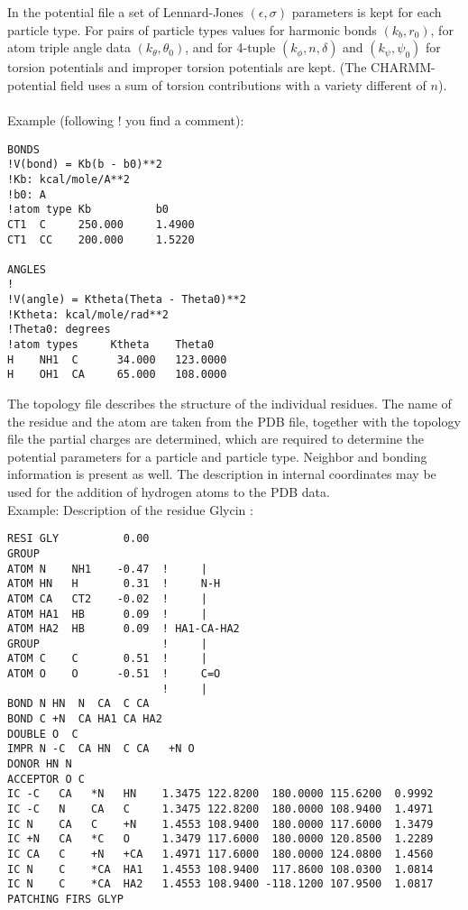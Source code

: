 In the potential file a set of Lennard-Jones $(\epsilon, \sigma)$ parameters is
kept for each particle type. For pairs of particle types values for harmonic bonds
$( k_b, r_0)$, for atom triple angle data $(k_\theta,
\theta_0)$, and for 4-tuple $(k_\phi, n, \delta)$ and $(k_\psi, \psi_0)$
for torsion potentials and improper torsion potentials are kept. (The CHARMM-potential field uses
a sum of torsion contributions with a variety different of $n$).\\
\\
Example \cite{charmm-files} (following ! you find a comment):
\begin{lstlisting}
BONDS
!V(bond) = Kb(b - b0)**2
!Kb: kcal/mole/A**2
!b0: A
!atom type Kb          b0
CT1  C     250.000     1.4900
CT1  CC    200.000     1.5220

ANGLES
!
!V(angle) = Ktheta(Theta - Theta0)**2
!Ktheta: kcal/mole/rad**2
!Theta0: degrees
!atom types     Ktheta    Theta0
H    NH1  C      34.000   123.0000
H    OH1  CA     65.000   108.0000
\end{lstlisting}


The topology file describes the structure of the individual residues.
The name of the residue and the atom are taken from the PDB file, together with
the topology file the partial charges are determined, which are required to
determine the potential parameters for a particle and particle type.
Neighbor and bonding information is present as well. The description
in internal coordinates may be used for the addition of hydrogen atoms
to the PDB data.\\
\bigbreak
Example: Description of the residue Glycin \cite{charmm-files}:
\begin{lstlisting}
RESI GLY          0.00
GROUP
ATOM N    NH1    -0.47  !     |
ATOM HN   H       0.31  !     N-H
ATOM CA   CT2    -0.02  !     |
ATOM HA1  HB      0.09  !     |
ATOM HA2  HB      0.09  ! HA1-CA-HA2
GROUP                   !     |
ATOM C    C       0.51  !     |
ATOM O    O      -0.51  !     C=O
                        !     |
BOND N HN  N  CA  C CA
BOND C +N  CA HA1 CA HA2
DOUBLE O  C
IMPR N -C  CA HN  C CA   +N O
DONOR HN N
ACCEPTOR O C
IC -C   CA   *N   HN    1.3475 122.8200  180.0000 115.6200  0.9992
IC -C   N    CA   C     1.3475 122.8200  180.0000 108.9400  1.4971
IC N    CA   C    +N    1.4553 108.9400  180.0000 117.6000  1.3479
IC +N   CA   *C   O     1.3479 117.6000  180.0000 120.8500  1.2289
IC CA   C    +N   +CA   1.4971 117.6000  180.0000 124.0800  1.4560
IC N    C    *CA  HA1   1.4553 108.9400  117.8600 108.0300  1.0814
IC N    C    *CA  HA2   1.4553 108.9400 -118.1200 107.9500  1.0817
PATCHING FIRS GLYP
\end{lstlisting}

